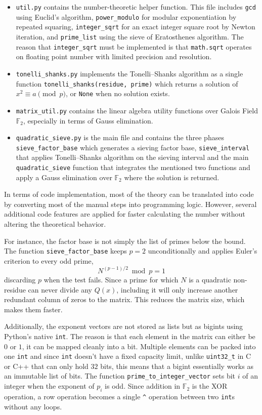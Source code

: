 \documentclass[11pt,a4paper]{article}
\begin{document}
\begin{itemize}
    \item \texttt{util.py} contains the number-theoretic helper function. This file includes \texttt{gcd} using Euclid's algorithm, \texttt{power\_modulo} for modular exponentiation by repeated squaring, \texttt{integer\_sqrt} for an exact integer square root by Newton iteration, and \texttt{prime\_list} using the sieve of Eratosthenes algorithm. The reason that \texttt{integer\_sqrt} must be implemented is that \texttt{math.sqrt} operates on floating point number with limited precision and resolution.
    \item \texttt{tonelli\_shanks.py} implements the Tonelli--Shanks algorithm as a single function \newline \texttt{tonelli\_shanks(residue, prime)} which returns a solution of $x^2\equiv a \pmod p$, or \texttt{None} when no solution exists.
    \item \texttt{matrix\_util.py} contains the linear algebra utility functions over Galois Field $\mathbb{F}_2$, especially in terms of Gauss elimination.
    \item \texttt{quadratic\_sieve.py} is the main file and contains the three phases \texttt{sieve\_factor\_base} which generates a sieving factor base, \texttt{sieve\_interval} that applies Tonelli--Shanks algorithm on the sieving interval and the main \texttt{quadratic\_sieve} function that integrates the mentioned two functions and apply a Gauss elimination over $\mathbb{F}_2$ where the solution is returned.
\end{itemize}

In terms of code implementation, most of the theory can be translated into code by converting most of the manual steps into programming logic. However, several additional code features are applied for faster calculating the number without altering the theoretical behavior.

For instance, the factor base is not simply the list of primes below the bound. The function \texttt{sieve\_factor\_base} keeps $p=2$ unconditionally and applies Euler's criterion to every odd prime,
\[
N^{(p-1)/2} \bmod p = 1
\]
discarding $p$ when the test fails. Since a prime for which $N$ is a quadratic non-residue can never divide any $Q(x)$, including it will only increase another redundant column of zeros to the matrix. This reduces the matrix size, which makes them faster.

Additionally, the exponent vectors are not stored as lists but as bigints using Python's native \texttt{int}. The reason is that each element in the matrix can either be $0$ or $1$, it can be mapped cleanly into a bit. Multiple elements can be packed into one \texttt{int} and since \texttt{int} doesn't have a fixed capacity limit, unlike \texttt{uint32\_t} in C or C++ that can only hold $32$ bits, this means that a bigint essentially works as an immutable list of bits.
The function \texttt{prime\_to\_integer\_vector} sets bit $i$ of an integer when the exponent of $p_i$ is odd. Since addition in $\mathbb{F}_2$ is the XOR operation, a row operation becomes a single \texttt{\^} operation between two \texttt{int}s without any loops.
\end{document}
